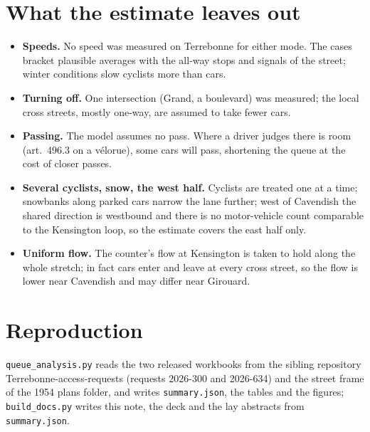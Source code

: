\documentclass[11pt,a4paper]{article}
\begin{document}
\section{What the estimate leaves out}
\begin{itemize}
\item \textbf{Speeds.} No speed was measured on Terrebonne for either mode. The cases bracket plausible averages with the all-way stops and signals of the street; winter conditions slow cyclists more than cars.
\item \textbf{Turning off.} One intersection (Grand, a boulevard) was measured; the local cross streets, mostly one-way, are assumed to take fewer cars.
\item \textbf{Passing.} The model assumes no pass. Where a driver judges there is room (art.~496.3 on a vélorue), some cars will pass, shortening the queue at the cost of closer passes.
\item \textbf{Several cyclists, snow, the west half.} Cyclists are treated one at a time; snowbanks along parked cars narrow the lane further; west of Cavendish the shared direction is westbound and there is no motor-vehicle count comparable to the Kensington loop, so the estimate covers the east half only.
\item \textbf{Uniform flow.} The counter\textquoteright{}s flow at Kensington is taken to hold along the whole stretch; in fact cars enter and leave at every cross street, so the flow is lower near Cavendish and may differ near Girouard.
\end{itemize}

\section{Reproduction}
\texttt{queue\_analysis.py} reads the two released workbooks from the sibling repository Terrebonne-access-requests (requests 2026-300 and 2026-634) and the street frame of the 1954 plans folder, and writes \texttt{summary.json}, the tables and the figures; \texttt{build\_docs.py} writes this note, the deck and the lay abstracts from \texttt{summary.json}.
\end{document}
